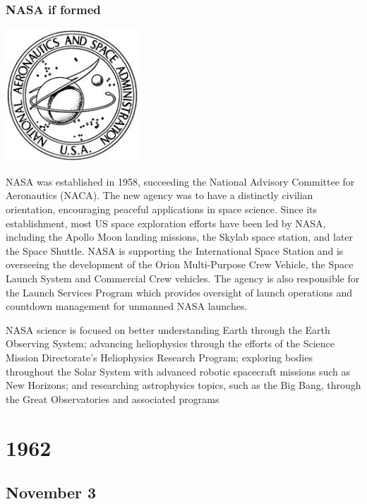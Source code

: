 \documentclass[11pt]{report}
\begin{document}
\subsection{NASA if formed}
\vspace{2mm}\begin{center}\includegraphics[width=5cm]{./img/nasa1stlogo.jpg}\end{center}
NASA was established in 1958, succeeding the National Advisory Committee for Aeronautics (NACA). The new agency was to have a distinctly civilian orientation, encouraging peaceful applications in space science. Since its establishment, most US space exploration efforts have been led by NASA, including the Apollo Moon landing missions, the Skylab space station, and later the Space Shuttle. NASA is supporting the International Space Station and is overseeing the development of the Orion Multi-Purpose Crew Vehicle, the Space Launch System and Commercial Crew vehicles. The agency is also responsible for the Launch Services Program which provides oversight of launch operations and countdown management for unmanned NASA launches.

NASA science is focused on better understanding Earth through the Earth Observing System; advancing heliophysics through the efforts of the Science Mission Directorate's Heliophysics Research Program; exploring bodies throughout the Solar System with advanced robotic spacecraft missions such as New Horizons; and researching astrophysics topics, such as the Big Bang, through the Great Observatories and associated programs

\chapter{1962}
\section{November 3}
\end{document}
